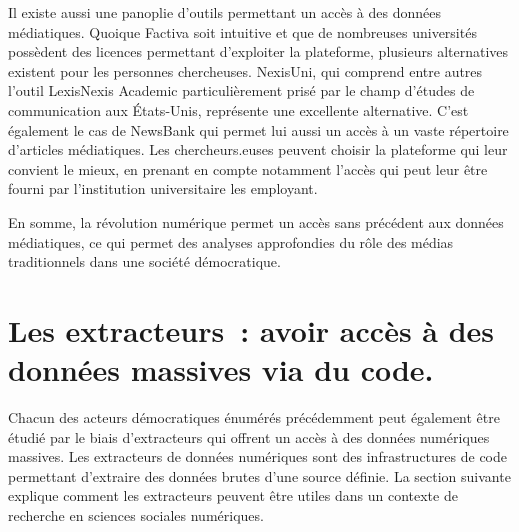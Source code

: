 \documentclass[
  letterpaper,
]{scrbook}
\begin{document}
Il existe aussi une panoplie d'outils permettant un accès à des données
médiatiques. Quoique Factiva soit intuitive et que de nombreuses
universités possèdent des licences permettant d'exploiter la plateforme,
plusieurs alternatives existent pour les personnes chercheuses.
NexisUni, qui comprend entre autres l'outil LexisNexis Academic
particulièrement prisé par le champ d'études de communication aux
États-Unis, représente une excellente alternative. C'est également le
cas de NewsBank qui permet lui aussi un accès à un vaste répertoire
d'articles médiatiques. Les chercheurs.euses peuvent choisir la
plateforme qui leur convient le mieux, en prenant en compte notamment
l'accès qui peut leur être fourni par l'institution universitaire les
employant.

En somme, la révolution numérique permet un accès sans précédent aux
données médiatiques, ce qui permet des analyses approfondies du rôle des
médias traditionnels dans une société démocratique.

\hypertarget{les-extracteurs-avoir-accuxe8s-uxe0-des-donnuxe9es-massives-via-du-code.}{%
\section{\texorpdfstring{\textbf{Les extracteurs~: avoir accès à des
données massives via du
code.}}{Les extracteurs~: avoir accès à des données massives via du code.}}\label{les-extracteurs-avoir-accuxe8s-uxe0-des-donnuxe9es-massives-via-du-code.}}

Chacun des acteurs démocratiques énumérés précédemment peut également
être étudié par le biais d'extracteurs qui offrent un accès à des
données numériques massives. Les extracteurs de données numériques sont
des infrastructures de code permettant d'extraire des données brutes
d'une source définie. La section suivante explique comment les
extracteurs peuvent être utiles dans un contexte de recherche en
sciences sociales numériques.
\end{document}
